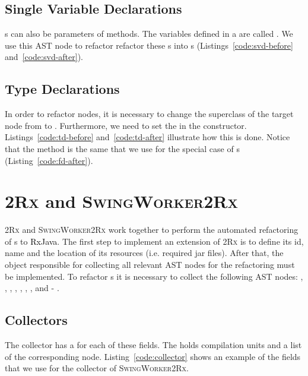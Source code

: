 \documentclass[type=bsc,accentcolor=tud9c]{tudthesis}
\newcommand{\framework}[1]{\textcolor{black}{#1}}
\newcommand{\toolcore}{\textsc{2Rx}}
\newcommand{\toolextension}{\textsc{SwingWorker2Rx}}
\begin{document}
\subsection{Single Variable Declarations}
\label{sec:imp-singleVarDeclaration}
s can also be parameters of methods. The variables defined in a  are called . We use this AST node to refactor refactor these s into s (Listings~\ref{code:svd-before} and~\ref{code:svd-after}).



\subsection{Type Declarations}
\label{sec:imp-typeDecl}
In order to refactor  nodes, it is necessary to change the superclass of the target node from  to . Furthermore, we need to set the  in the constructor. Listings~\ref{code:td-before} and~\ref{code:td-after} illustrate how this is done. Notice that the method  is the same that we use for the special case of s (Listing~\ref{code:fd-after}).



\section{\toolcore{} and \toolextension{}}
\toolcore{} and \toolextension{} work together to perform the automated refactoring of s to \framework{RxJava}. The first step to implement an extension of \toolcore{} is to define its id, name and the location of its resources (i.e. required jar files). After that, the object responsible for collecting all relevant AST nodes for the refactoring must be implemented. To refactor s it is necessary to collect the following AST nodes: , , , , , , ,  and - .


\subsection{Collectors}
The collector has a  for each of these fields. The  holds compilation units and a list of the corresponding node. Listing~\ref{code:collector} shows an example of the fields that we use for the collector of \toolextension{}.
\end{document}
